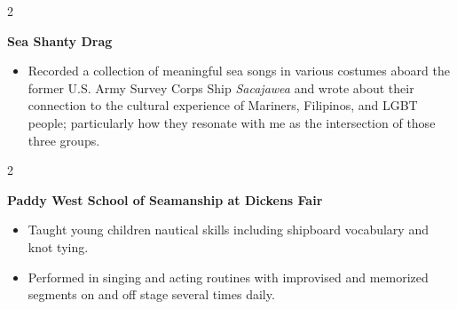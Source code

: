 \documentclass[10pt, letterpaper]{article}
\newenvironment{highlights}{
    \begin{itemize}[
        topsep=0.10 cm,
        parsep=0.10 cm,
        partopsep=0pt,
        itemsep=0pt,
        leftmargin=0.4 cm + 10pt
    ]
}{
    \end{itemize}
} %
\newenvironment{twocolentry}[2][]{
    \onecolentry
    \def\secondColumn{#2}
    \setcolumnwidth{\fill, 4.5 cm}
    \begin{paracol}{2}
}{
    \switchcolumn \raggedleft \secondColumn
    \end{paracol}
    \endonecolentry
} %
\begin{document}
        \vspace{0.2 cm}

        \begin{twocolentry}{
            2023
        }
            \textbf{Sea Shanty Drag}
            \begin{highlights}
                \item Recorded a collection of meaningful sea songs in various costumes aboard the former U.S. Army Survey Corps Ship \textit{Sacajawea} and wrote about their connection to the cultural experience of Mariners, Filipinos, and LGBT people; particularly how they resonate with me as the intersection of those three groups.
            \end{highlights}
        \end{twocolentry}


        \vspace{0.2 cm}

        \begin{twocolentry}{
            2022
        }
            \textbf{Paddy West School of Seamanship at Dickens Fair}
            \begin{highlights}
                \item Taught young children nautical skills including shipboard vocabulary and knot tying.
                \item Performed in singing and acting routines with improvised and memorized segments on and off stage several times daily.
            \end{highlights}
        \end{twocolentry}



    
\end{document}
